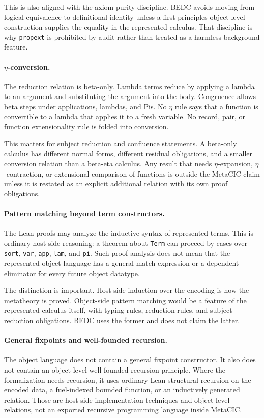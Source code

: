 This is also aligned with the axiom-purity discipline.  BEDC avoids moving
from logical equivalence to definitional identity unless a first-principles
object-level construction supplies the equality in the represented calculus.
That discipline is why \texttt{propext} is prohibited by audit rather than
treated as a harmless background feature.

\paragraph{$\eta$-conversion.}
The reduction relation is beta-only.  Lambda terms reduce by applying a
lambda to an argument and substituting the argument into the body.  Congruence
allows beta steps under applications, lambdas, and Pis.  No $\eta$ rule says
that a function is convertible to a lambda that applies it to a fresh
variable.  No record, pair, or function extensionality rule is folded into
conversion.

This matters for subject reduction and confluence statements.  A beta-only
calculus has different normal forms, different residual obligations, and a
smaller conversion relation than a beta-eta calculus.  Any result that needs
$\eta$-expansion, $\eta$-contraction, or extensional comparison of functions
is outside the MetaCIC claim unless it is restated as an explicit additional
relation with its own proof obligations.

\paragraph{Pattern matching beyond term constructors.}
The Lean proofs may analyze the inductive syntax of represented terms.  This
is ordinary host-side reasoning: a theorem about \texttt{Term} can proceed by
cases over \texttt{sort}, \texttt{var}, \texttt{app}, \texttt{lam}, and
\texttt{pi}.  Such proof analysis does not mean that the represented object
language has a general match expression or a dependent eliminator for every
future object datatype.

The distinction is important.  Host-side induction over the encoding is how
the metatheory is proved.  Object-side pattern matching would be a feature of
the represented calculus itself, with typing rules, reduction rules, and
subject-reduction obligations.  BEDC uses the former and does not claim the
latter.

\paragraph{General fixpoints and well-founded recursion.}
The object language does not contain a general fixpoint constructor.  It also
does not contain an object-level well-founded recursion principle.  Where the
formalization needs recursion, it uses ordinary Lean structural recursion on
the encoded data, a fuel-indexed bounded function, or an inductively generated
relation.  Those are host-side implementation techniques and object-level
relations, not an exported recursive programming language inside MetaCIC.

